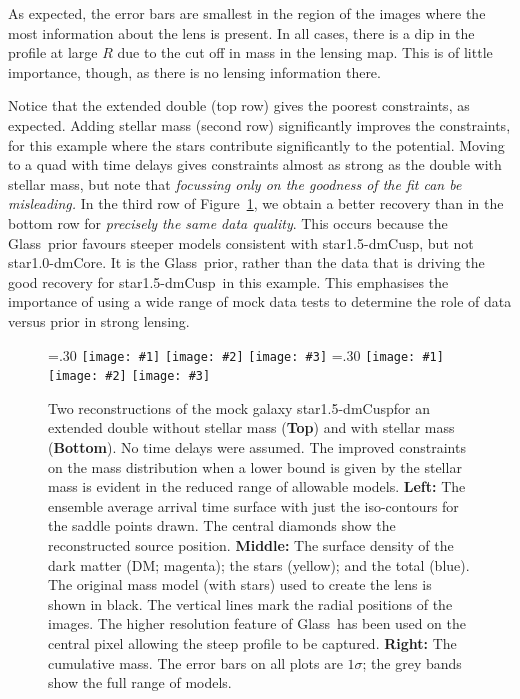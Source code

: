 \documentclass[galley,usenatbib]{mn2e}
\newcommand{\Glass}{{\sc Glass}}
\newcommand{\figref}[1] {Figure~\ref{#1}}
\newcommand{\mockAA}{{\sc star1.0-dmCore}}
\newcommand{\mockBC}{{\sc star1.5-dmCusp}}
\newcommand\plotthree[3]{{%
 \centering
 \leavevmode
 \columnwidth=.30\textwidth
 \texttt{[image: \#1]}%
 \hfil
 \texttt{[image: \#2]}%
 \hfil
 \texttt{[image: \#3]}%
}}%
\begin{document}
As expected, the error bars are smallest in the region of the images where the
most information about the lens is present. In all cases, there is a dip in the
profile at large $R$ due to the cut off in mass in the lensing map. This is of
little importance, though, as there is no lensing information there. 

Notice that the extended double (top row) gives the poorest constraints, as
expected. Adding stellar mass (second row) significantly improves the
constraints, for this example where the stars contribute significantly to the
potential. Moving to a quad with time delays gives constraints almost as strong
as the double with stellar mass, but note that {\it focussing only on the
goodness of the fit can be misleading.} In the third row of
\figref{reconstruction}, we obtain a better recovery than in the bottom row for
{\it precisely the same data quality}. This occurs because the \Glass\ prior
favours steeper models consistent with \mockBC, but not \mockAA. It is the
\Glass\ prior, rather than the data that is driving the good recovery for
\mockBC\ in this example. This emphasises the importance of using a wide range
of mock data tests to determine the role of data versus prior in strong
lensing.

\begin{figure}
  \plotthree{BCExtendedDoubleR1_tms-a.pdf} {BCExtendedDoubleR1_tms-b.pdf} {BCExtendedDoubleR1_tms-c.pdf}
  \plotthree{BCExtendedDoubleR1_tmS-a-1.pdf} {BCExtendedDoubleR1_tmS-b-1.pdf} {BCExtendedDoubleR1_tmS-c-1.pdf}
\caption{
    Two reconstructions of the mock galaxy \mockBC for an extended
    double without stellar mass (\textbf{Top}) and with stellar mass
    (\textbf{Bottom}).  No time delays were assumed.  The improved constraints
    on the mass distribution when a lower bound is given by the stellar mass is
    evident in the reduced range of allowable models.  
\textbf{Left:}
The ensemble average arrival time surface with just the iso-contours for the
saddle points drawn. The central diamonds show the reconstructed source
position.
\textbf{Middle:}
The surface density of the dark matter (DM; magenta); the stars (yellow); and the total (blue).
The original mass model (with stars) used to create the lens is shown in black.
The vertical lines mark the radial positions of the images. The higher
resolution feature of \Glass\ has been used on the central pixel allowing the
steep profile to be captured.
\textbf{Right:}
The cumulative mass. The error bars on all plots are $1\sigma$; the grey bands show the full range of models.}
\label{reconstruction}
\end{figure}
\end{document}
